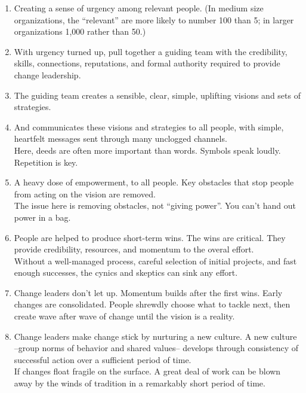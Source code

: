 \documentclass[english,14pt,a4paper,final,oneside]{article}
\begin{document}
\begin{enumerate}

\item Creating a sense of urgency among relevant people. (In medium size organizations, the ``relevant'' are more likely to number 100 than 5; in larger organizations 1,000 rather than 50.)

\item With urgency turned up, pull together a guiding team with the credibility, skills, connections, reputations, and formal authority required to provide change leadership.

\item The guiding team creates a sensible, clear, simple, uplifting visions and sets of strategies.

\item And communicates these visions and strategies to all people, with simple, heartfelt messages sent through many unclogged channels.
\\Here, deeds are often more important than words. Symbols speak loudly. Repetition is key.

\item A heavy dose of empowerment, to all people. Key obstacles that stop people from acting on the vision are removed.
\\The issue here is removing obstacles, not ``giving power''. You can't hand out power in a bag.

\item People are helped to produce short-term wins. The wins are critical. They provide credibility, resources, and momentum to the overal effort.
\\Without a well-managed process, careful selection of initial projects, and fast enough successes, the cynics and skeptics can sink any effort.

\item Change leaders don't let up. Momentum builds after the first wins. Early changes are consolidated. People shrewdly choose what to tackle next, then create wave after wave of change until the vision is a reality.

\item Change leaders make change stick by nurturing a new culture. A new culture --group norms of behavior and shared values-- develops through consistency of successful action over a sufficient period of time.
\\If changes float fragile on the surface. A great deal of work can be blown away by the winds of tradition in a remarkably short period of time.

\end{enumerate}
\end{document}
